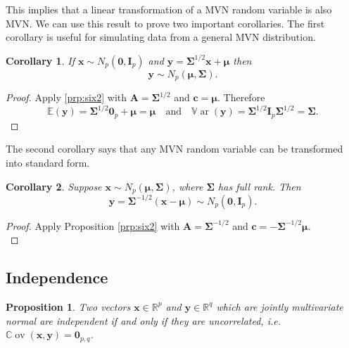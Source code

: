 \documentclass[]{book}
\newtheorem{corollary}{Corollary}[chapter]
\newtheorem{proposition}{Proposition}[chapter]
\theoremstyle{definition}
\theoremstyle{definition}
\theoremstyle{definition}
\theoremstyle{remark}
\begin{document}
This implies that a linear transformation of a MVN random variable is also MVN. We can use this result to prove two important corollaries. The first corollary is useful for simulating data from a general MVN distribution.

\begin{corollary}
\protect\hypertarget{cor:csix2}{}{\label{cor:csix2} } If \(\mathbf x\sim N_p(\boldsymbol 0,\mathbf I_p)\) and \(\mathbf y= \boldsymbol{\Sigma}^{1/2} \mathbf x+ {\boldsymbol{\mu}}\) then \[\mathbf y\sim N_p({\boldsymbol{\mu}},\boldsymbol{\Sigma}).\]
\end{corollary}

\begin{proof}
{}Apply \ref{prp:six2} with \(\mathbf A= \boldsymbol{\Sigma}^{1/2}\) and \(\mathbf c= {\boldsymbol{\mu}}\). Therefore
\[{\mathbb{E}}(\mathbf y) = \boldsymbol{\Sigma}^{1/2} \boldsymbol 0_p + {\boldsymbol{\mu}}= {\boldsymbol{\mu}}\quad \mbox{and}\quad {\mathbb{V}\operatorname{ar}}(\mathbf y) = \boldsymbol{\Sigma}^{1/2} \mathbf I_p \boldsymbol{\Sigma}^{1/2} = \boldsymbol{\Sigma}.\]
\end{proof}

The second corollary says that any MVN random variable can be transformed into standard form.

\begin{corollary}
\protect\hypertarget{cor:csix3}{}{\label{cor:csix3} }Suppose \(\mathbf x\sim N_p({\boldsymbol{\mu}},\boldsymbol{\Sigma})\), where \(\boldsymbol{\Sigma}\) has full rank. Then\\
\[\mathbf y= \boldsymbol{\Sigma}^{-1/2}(\mathbf x- {\boldsymbol{\mu}}) \sim N_p(\boldsymbol 0,\mathbf I_p).\]
\end{corollary}

\begin{proof}
{}Apply Proposition \ref{prp:six2} with \(\mathbf A= \boldsymbol{\Sigma}^{-1/2}\) and \(\mathbf c= - \boldsymbol{\Sigma}^{-1/2} {\boldsymbol{\mu}}\).\\
\end{proof}

\hypertarget{independence}{%
\subsection{Independence}\label{independence}}

\begin{proposition}
\protect\hypertarget{prp:six4}{}{\label{prp:six4} }Two vectors \(\mathbf x\in\mathbb{R}^p\) and \(\mathbf y\in\mathbb{R}^q\) which are jointly multivariate normal are independent if and only if they are uncorrelated, i.e. \({\mathbb{C}\operatorname{ov}}(\mathbf x,\mathbf y) = \boldsymbol 0_{p,q}\).
\end{proposition}
\end{document}

